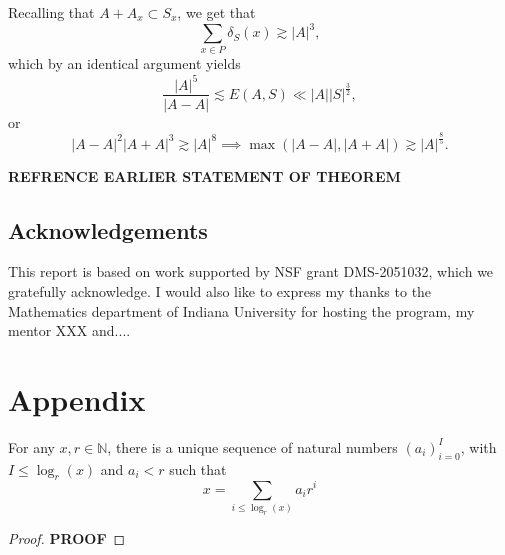 \documentclass[12pt,reqno]{amsart}
\begin{document}
Recalling that \(A + A_{x} \subset S_{x} \), we get that
\[
    \sum _{x \in P} \delta_{S} (x) \gtrsim \left\lvert A \right\rvert ^{3} 
,\]
which by an identical argument yields
\[
    \frac{\left\lvert A \right\rvert ^{5} }{\left\lvert A-A \right\rvert } \lesssim E(A,S) \ll \left\lvert A \right\rvert \left\lvert S \right\rvert ^{\frac{3}{2} }
,\]
or
\[
    \left\lvert A-A \right\rvert ^{2} \left\lvert A+A \right\rvert ^{3} \gtrsim \left\lvert A \right\rvert ^{8} \implies \max \left( \left\lvert A-A \right\rvert , \left\lvert A+A \right\rvert  \right) \gtrsim \left\lvert A \right\rvert^{\frac{8}{5} }
.\]

\textbf{REFRENCE EARLIER STATEMENT OF THEOREM}

\subsection*{Acknowledgements} %
This report is based on work supported by NSF grant DMS-2051032, which we gratefully acknowledge. I would also like to express my thanks to the Mathematics department of Indiana University for hosting the program, my mentor XXX and....




\section*{Appendix}

\begin{theorem*}
For any \(x,r \in \mathbb{N} \), there is a unique sequence of natural numbers \(\left( a_{i}  \right) _{i = 0} ^{I} \), with
\(I \leq \log _{r} \left( x \right) \) and \(a_{i} < r\) such that
\[
    x = \sum _{i \leq \log _{r} \left( x \right) } a_{i} r^{i}
\]
\end{theorem*}

\begin{proof}
\textbf{PROOF}
\end{proof}
\end{document}

